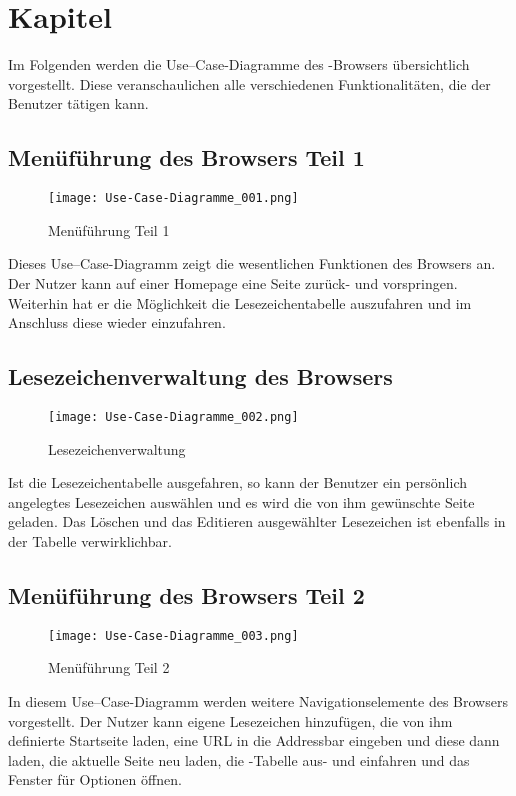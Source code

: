 
\chapter{Kapitel}

Im Folgenden werden die Use--Case-Diagramme des \SECH-Browsers übersichtlich vorgestellt. Diese veranschaulichen alle verschiedenen Funktionalitäten, die der Benutzer tätigen kann.

\section{Menüführung des Browsers Teil 1}

\begin{figure}[htb]
\texttt{[image: Use-Case-Diagramme\_001.png]}
	\caption{Menüführung Teil 1}
	\label{fig:Menüführung Teil 1}
\end{figure}
	
Dieses Use--Case-Diagramm zeigt die wesentlichen Funktionen des Browsers an. Der Nutzer kann auf einer Homepage eine Seite zurück- und vorspringen. Weiterhin hat er die Möglichkeit die Lesezeichentabelle auszufahren und im Anschluss diese wieder einzufahren.

\section{Lesezeichenverwaltung des Browsers}

\begin{figure}[htb]
\texttt{[image: Use-Case-Diagramme\_002.png]}
	\caption{Lesezeichenverwaltung}
	\label{fig:Lesezeichenverwaltung}
\end{figure}

Ist die Lesezeichentabelle ausgefahren, so kann der Benutzer ein persönlich angelegtes Lesezeichen auswählen und es wird die von ihm gewünschte Seite geladen. Das Löschen und das Editieren ausgewählter Lesezeichen ist ebenfalls in der Tabelle verwirklichbar.

\section{Menüführung des Browsers Teil 2}

\begin{figure}[htb]
\texttt{[image: Use-Case-Diagramme\_003.png]}
	\caption{Menüführung Teil 2}
	\label{fig:Menüführung Teil 2}
\end{figure}
In diesem Use--Case-Diagramm werden weitere Navigationselemente des Browsers vorgestellt. Der Nutzer kann eigene Lesezeichen hinzufügen, die von ihm definierte Startseite laden, eine URL in die Addressbar eingeben und diese dann laden, die aktuelle Seite neu laden, die \SEARCH-Tabelle aus- und einfahren und das Fenster für Optionen öffnen.

